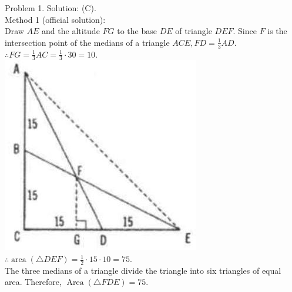 \documentclass[10pt]{article}
\begin{document}
Problem 1. Solution: (C).\\
Method 1 (official solution):\\
Draw \(A E\) and the altitude \(F G\) to the base \(D E\) of triangle \(D E F\). Since \(F\) is the intersection point of the medians of a triangle \(A C E, F D=\frac{1}{3} A D\).\\
\(\therefore F G=\frac{1}{3} A C=\frac{1}{3} \cdot 30=10\).\\
\includegraphics[max width=\textwidth, center]{2025_04_17_97bc1f7e44d93c271a88g-017(1)}\\
\(\therefore \operatorname{area}(\triangle D E F)=\frac{1}{2} \cdot 15 \cdot 10=75\).\\
The three medians of a triangle divide the triangle into six triangles of equal area. Therefore, \(\operatorname{Area}(\triangle F D E)=75\).
\end{document}
